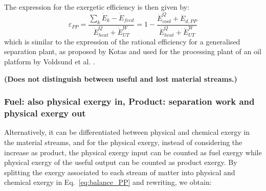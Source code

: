 The expression for the exergetic efficiency is then given by:
\begin{equation}
	\varepsilon_{PP}=\frac{\sum_k\dot{E}_k-\dot{E}_{feed}}{\dot{E}^{Q}_{heat}+\dot{E}^{W}_{UT}}=1-\frac{\dot{E}^{Q}_{cool}+\dot{E}_{d,PP}}{\dot{E}^{Q}_{heat}+\dot{E}^{W}_{UT}}
\end{equation}
which is similar to the expression of the rational efficiency for a generalised separation plant, as proposed by Kotas \cite{Kotas1995} and used for the processing plant of an oil platform by Voldsund et al. \cite{Voldsund2010,Voldsund2012,Voldsund2013}. 

\textbf{(Does not distinguish between useful and lost material streams.)}

	
\subsubsection{Fuel: also physical exergy in, Product: separation work and physical exergy out}

Alternatively, it can be differentiated between physical and chemical exergy in the material streams, and for the physical exergy, instead of considering the increase as product, the physical exergy input can be counted as fuel exergy while physical exergy of the useful output can be counted as product exergy. By splitting the exergy associated to each stream of matter into physical and chemical exergy in Eq.~\ref{eq:balance_PP} and rewriting, we obtain:





